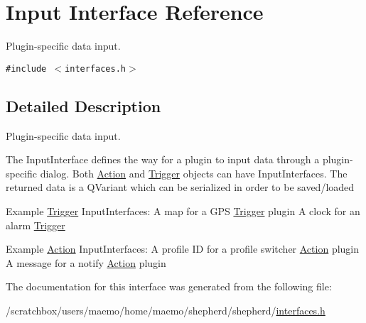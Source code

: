 \hypertarget{interface_input}{
\section{Input Interface Reference}
\label{interface_input}
}
Plugin-specific data input.  


{\tt \#include $<$interfaces.h$>$}



\subsection{Detailed Description}
Plugin-specific data input. 

The InputInterface defines the way for a plugin to input data through a plugin-specific dialog. Both \hyperlink{interface_action}{Action} and \hyperlink{interface_trigger}{Trigger} objects can have InputInterfaces. The returned data is a QVariant which can be serialized in order to be saved/loaded

Example \hyperlink{interface_trigger}{Trigger} InputInterfaces: A map for a GPS \hyperlink{interface_trigger}{Trigger} plugin A clock for an alarm \hyperlink{interface_trigger}{Trigger}

Example \hyperlink{interface_action}{Action} InputInterfaces: A profile ID for a profile switcher \hyperlink{interface_action}{Action} plugin A message for a notify \hyperlink{interface_action}{Action} plugin 

The documentation for this interface was generated from the following file:\begin{CompactItemize}
\item 
/scratchbox/users/maemo/home/maemo/shepherd/shepherd/\hyperlink{interfaces_8h}{interfaces.h}\end{CompactItemize}
